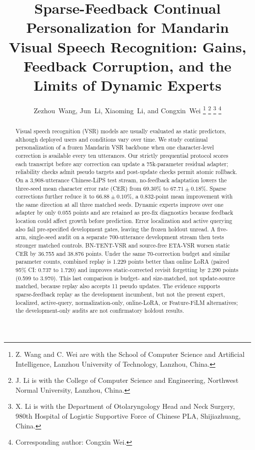 \documentclass[10pt,journal]{IEEEtran}
\begin{document}
\title{Sparse-Feedback Continual Personalization for Mandarin Visual Speech Recognition: Gains, Feedback Corruption, and the Limits of Dynamic Experts}

\author{Zezhou~Wang, Jun~Li, Xiaoming~Li, and Congxin~Wei%
\thanks{Z. Wang and C. Wei are with the School of Computer Science and Artificial Intelligence, Lanzhou University of Technology, Lanzhou, China.}%
\thanks{J. Li is with the College of Computer Science and Engineering, Northwest Normal University, Lanzhou, China.}%
\thanks{X. Li is with the Department of Otolaryngology Head and Neck Surgery, 980th Hospital of Logistic Supportive Force of Chinese PLA, Shijiazhuang, China.}%
\thanks{Corresponding author: Congxin Wei.}}

\maketitle
{}

\begin{abstract}
Visual speech recognition (VSR) models are usually evaluated as static predictors, although deployed users and conditions vary over time. We study continual personalization of a frozen Mandarin VSR backbone when one character-level correction is available every ten utterances. Our strictly prequential protocol scores each transcript before any correction can update a 75k-parameter residual adapter; reliability checks admit pseudo targets and post-update checks permit atomic rollback. On a 3,908-utterance Chinese-LiPS test stream, no-feedback adaptation lowers the three-seed mean character error rate (CER) from 69.30\% to $67.71\pm0.18$\%. Sparse corrections further reduce it to $66.88\pm0.10$\%, a 0.832-point mean improvement with the same direction at all three matched seeds. Dynamic experts improve over one adapter by only 0.055 points and are retained as pre-fix diagnostics because feedback location could affect growth before prediction. Error localization and active querying also fail pre-specified development gates, leaving the frozen holdout unread. A five-arm, single-seed audit on a separate 700-utterance development stream then tests stronger matched controls. BN-TENT-VSR and source-free ETA-VSR worsen static CER by 36.755 and 38.876 points. Under the same 70-correction budget and similar parameter counts, combined replay is 1.229 points better than online LoRA (paired 95\% CI: 0.737 to 1.720) and improves static-corrected revisit forgetting by 2.290 points (0.599 to 3.970). This last comparison is budget- and size-matched, not update-source matched, because replay also accepts 11 pseudo updates. The evidence supports sparse-feedback replay as the development incumbent, but not the present expert, localized, active-query, normalization-only, online-LoRA, or Feature-FiLM alternatives; the development-only audits are not confirmatory holdout results.
\end{abstract}
\end{document}
